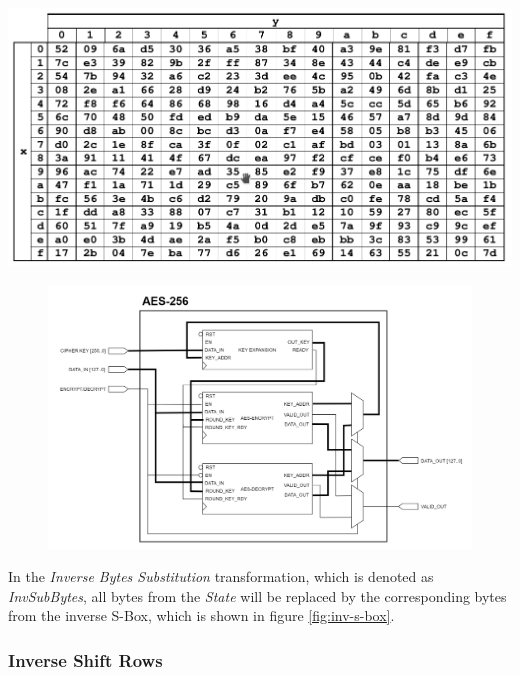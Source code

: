 \documentclass[a4paper, 10pt]{article}
\newenvironment{Figure}
    {\par\medskip\noindent\minipage{\linewidth}}
    {\endminipage\par\medskip}
\begin{document}
\begin{multicols}{2}
	\noindent
            \begin{Figure}
                \centering
                \includegraphics[width=\linewidth]{Inv S-box.png}
                \label{fig:inv-s-box}
            \end{Figure}

	\noindent
            \begin{figure}[t]
                \centering
                \includegraphics[width=0.8\linewidth]{AES-256.png}
                \label{fig:aes-256-top-level-design}
            \end{figure}

            In the \textit{Inverse Bytes Substitution} transformation, which is denoted as \textit{InvSubBytes}, all bytes from the \textit{State} will be replaced by the corresponding bytes from the inverse S-Box, which is shown in figure \ref{fig:inv-s-box}.

            \subsubsection{Inverse Shift Rows}


\end{multicols}
\end{document}
